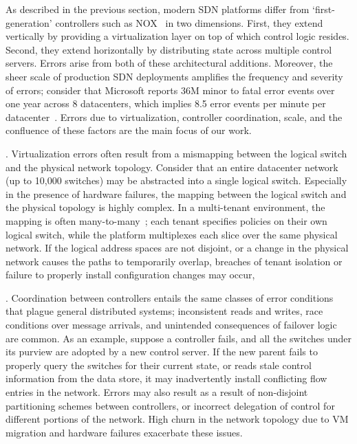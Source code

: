 As described in the previous section, modern SDN platforms differ from
`first-generation' controllers such as NOX~\cite{nox} in two dimensions. 
First, they extend vertically by providing a virtualization layer on top of
which control logic resides. Second, they extend horizontally by
distributing state across multiple control servers. Errors arise from both of
these architectural additions. Moreover, the sheer scale of production
SDN deployments amplifies the
frequency and severity of errors; consider that Microsoft reports 36M 
minor to fatal error events over one year across 8 datacenters,
which implies 8.5 error events per minute per
datacenter~\cite{Greenberg:2009:VSF:1592568.1592576}. Errors due to virtualization,
controller coordination, scale, and the confluence of these factors are the main
focus of our work.

. Virtualization errors often result from a mismapping between the logical
switch and the physical network topology. Consider that an entire datacenter
network (up to 10,000 switches) may be abstracted into a single logical switch. Especially in the
presence of hardware failures, the mapping between the logical switch and the
physical topology is highly complex. In a multi-tenant environment, the mapping is often
many-to-many~\cite{Casado:2010:VNF:1921151.1921162}; each tenant specifies
policies on their own logical switch, while the platform multiplexes each
slice over the same physical network. If the logical address
spaces are not disjoint, or a change in the physical network causes the paths
to temporarily overlap, breaches of tenant isolation or failure to properly
install configuration changes may occur,

. Coordination between controllers
entails the same classes of error
conditions that plague general distributed systems; inconsistent reads and
writes, race conditions over message arrivals, and unintended consequences of failover
logic are common. As an example, suppose a controller fails, and all the
switches under its purview are adopted by a new control server. If the new parent
fails to properly query the switches for their current state, or reads
stale control information from the data store, it may inadvertently install
conflicting flow entries in the network. Errors may also result as a
result of non-disjoint partitioning
schemes between controllers, or incorrect delegation of control for different
portions of the network. 
High churn in the network topology due to VM migration and
hardware failures exacerbate these issues.

